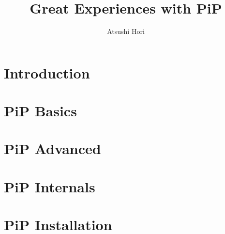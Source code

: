 \documentclass[a4paper,11pt,makeidx]{report} %
\title{Great Experiences with PiP} %
\author{Atsushi Hori} %
\begin{document}
\maketitle

\newpage %


\tableofcontents %
\lstlistoflistings
\listoffigures
\listoftables

\chapter*{Introduction}



\chapter{PiP Basics}\label{chap:basics}






%

\chapter{PiP Advanced}\label{chap:advanced}







\chapter{PiP Internals}
\comment{
  
  
}

\appendix
\chapter{PiP Installation}

\printindex
\end{document}
